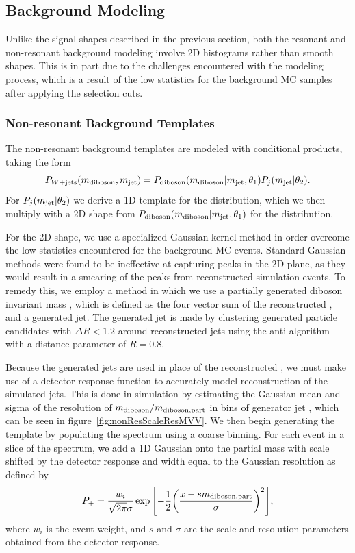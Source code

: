 \subsection{Background Modeling}
\label{sec:bkg}

Unlike the signal shapes described in the previous section, both the resonant and non-resonant background modeling involve 2D histograms rather than smooth shapes.
This is in part due to the challenges encountered with the modeling process, which is a result of the low statistics for the background MC samples after applying the selection cuts.

\subsubsection{Non-resonant Background Templates}

The non-resonant background templates are modeled with conditional products, taking the form
\begin{equation}
  P_{W+\text{jets}}(m_\mathrm{diboson},m_\mathrm{jet})=P_\mathrm{diboson}(m_\mathrm{diboson}|m_\mathrm{jet},\theta_1)P_j(m_\mathrm{jet}|\theta_2).
\end{equation}
For $P_j(m_\mathrm{jet}|\theta_2)$ we derive a 1D template for the \MJ distribution, which we then multiply with a 2D shape from $P_\mathrm{diboson}(m_\mathrm{diboson}|m_\mathrm{jet},\theta_1)$ for the \MVV distribution.

For the 2D \MVV shape, we use a specialized Gaussian kernel method in order overcome the low statistics encountered for the background MC events.
Standard Gaussian methods were found to be ineffective at capturing peaks in the 2D plane, as they would result in a smearing of the peaks from reconstructed simulation events.
To remedy this, we employ a method in which we use a partially generated diboson invariant mass \MVVpart, which is defined as the four vector sum of the reconstructed \Wlep, and a generated jet.
The generated jet is made by clustering generated particle candidates with $\Delta R<1.2$ around reconstructed jets using the anti-\kt algorithm with a distance parameter of $R=0.8$.

Because the generated jets are used in place of the reconstructed \Vhad, we must make use of a detector response function to accurately model reconstruction of the simulated jets.
This is done in simulation by estimating the Gaussian mean and sigma of the resolution of $m_\mathrm{diboson}/m_\mathrm{diboson,part}$ in bins of generator jet \pt, which can be seen in figure~\ref{fig:nonResScaleResMVV}.
We then begin generating the template by populating the \MJ spectrum using a coarse binning.
For each event in a slice of the \MJ spectrum, we add a 1D Gaussian onto the partial mass with scale shifted by the detector response and width equal to the Gaussian resolution as defined by
\begin{equation}\label{eq:Pplus}
  P_+=\frac{w_i}{\sqrt{2\pi}\sigma}\exp\bqty{-\frac{1}{2}\pqty{\frac{x-s\MVVpart}{\sigma}}^2},
\end{equation}
where $w_i$ is the event weight, and $s$ and $\sigma$ are the scale and resolution parameters obtained from the detector response.

